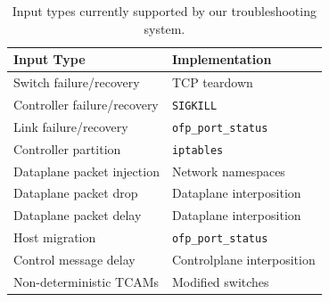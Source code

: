 \begin{table}[tb]
\centering
\footnotesize
\begin{tabular}{|l|l|}
\hline
\textbf{Input Type} & \textbf{Implementation} \\
\hline
\hline
Switch failure/recovery & TCP teardown \\
\hline
Controller failure/recovery & \verb=SIGKILL= \\
\hline
Link failure/recovery & \verb=ofp_port_status= \\
\hline
Controller partition & \verb=iptables= \\
\hline
Dataplane packet injection & Network namespaces \\
\hline
Dataplane packet drop & Dataplane interposition \\
\hline
Dataplane packet delay & Dataplane interposition \\
\hline
Host migration & \verb=ofp_port_status= \\
\hline
Control message delay & Controlplane interposition \\
\hline
Non-deterministic TCAMs & Modified switches \\
\hline
\end{tabular}
\caption{Input types currently supported by our troubleshooting system.}
\label{tab:inputs}
\vspace{-0.2cm}
\end{table}


